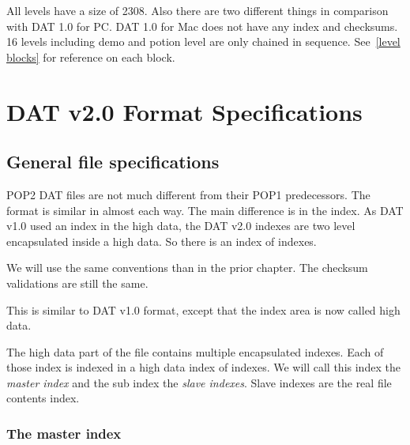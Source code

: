 \documentclass{article}
\begin{document}
  All levels have a size of 2308. Also there are two different things 
  in comparison with DAT 1.0 for PC. DAT 1.0 for  Mac does not have 
  any index and checksums. 16 levels including demo and potion level
  are only chained in sequence. See~\ref{level blocks} for reference on each block.

\pagebreak[3]
\section{DAT v2.0 Format Specifications}

\subsection{General file specifications}
 POP2 DAT files are not much different from their POP1 predecessors.
 The format is similar in almost each way. The main difference is in the
 index. As DAT v1.0 used an index in the high data, the DAT v2.0 indexes
 are two level encapsulated inside a high data. So there is an index of
 indexes.

 We will use the same conventions than in the prior chapter.
 The checksum validations are still the same.



 This is similar to DAT v1.0 format, except that the index area is now
 called high data.

 The high data part of the file contains multiple encapsulated indexes.
 Each of those index is indexed in a high data index of indexes. We will
 call this index the  {\it master index} and the sub index the  {\it slave indexes}.
 Slave indexes are the real file contents index.

\subsubsection{The master index} %
\end{document}
